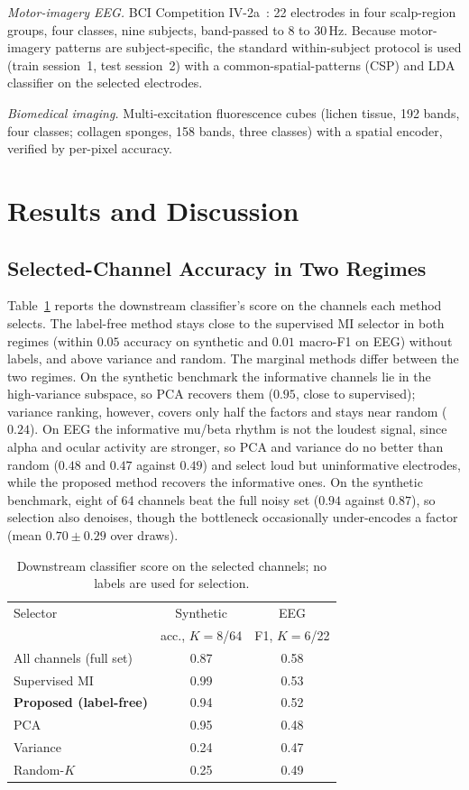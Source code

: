 \documentclass[conference]{IEEEtran}
\begin{document}
\emph{Motor-imagery EEG.} BCI Competition IV-2a~\cite{ref_bciiv2a}: 22 electrodes in
four scalp-region groups, four classes, nine subjects, band-passed to 8 to 30\,Hz.
Because motor-imagery patterns are subject-specific, the standard within-subject
protocol is used (train session~1, test session~2) with a
common-spatial-patterns (CSP) and LDA classifier on the selected electrodes.

\emph{Biomedical imaging.} Multi-excitation fluorescence cubes (lichen tissue, 192
bands, four classes; collagen sponges, 158 bands, three classes) with a spatial
encoder, verified by per-pixel accuracy.

\section{Results and Discussion}
\subsection{Selected-Channel Accuracy in Two Regimes}
Table~\ref{tab:perf} reports the downstream classifier's score on the channels each
method selects. The label-free method stays close to the supervised MI selector in
both regimes (within $0.05$ accuracy on synthetic and $0.01$ macro-F1 on EEG)
without labels, and above variance and random. The marginal methods differ between
the two regimes. On the
synthetic benchmark the informative channels lie in the high-variance subspace, so
PCA recovers them ($0.95$, close to supervised); variance ranking, however, covers
only half the factors and stays near random ($0.24$). On EEG the informative
mu/beta rhythm is not the loudest signal, since alpha and ocular activity are
stronger, so PCA and variance do no better than random ($0.48$ and $0.47$ against
$0.49$) and select loud but uninformative electrodes, while the proposed method
recovers the informative ones. On the synthetic benchmark, eight of 64 channels
beat the full noisy set ($0.94$ against $0.87$), so selection also denoises, though
the bottleneck occasionally under-encodes a factor (mean $0.70\pm0.29$ over draws).

\begin{table}[t]
\caption{Downstream classifier score on the selected channels; no labels are used
for selection.}
\label{tab:perf}
\centering
\footnotesize
\setlength{\tabcolsep}{6pt}
\renewcommand{\arraystretch}{1.15}
\begin{tabular}{@{}lcc@{}}
\toprule
Selector & Synthetic & EEG \\
 & acc., $K{=}8$/64 & F1, $K{=}6$/22 \\
\midrule
All channels (full set) & 0.87 & 0.58 \\
Supervised MI & 0.99 & 0.53 \\
\textbf{Proposed (label-free)} & 0.94 & 0.52 \\
PCA & 0.95 & 0.48 \\
Variance & 0.24 & 0.47 \\
Random-$K$ & 0.25 & 0.49 \\
\bottomrule
\end{tabular}
\end{table}
\end{document}

